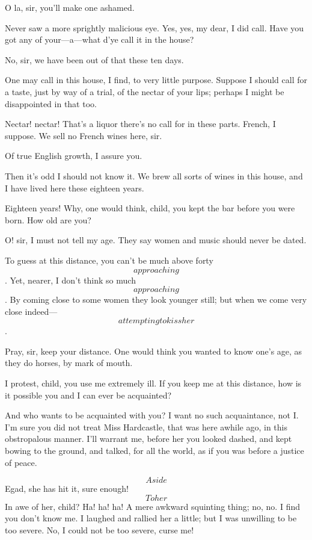 \documentclass{book}
\begin{document}
\8  O la, sir, you'll make one ashamed.

\2  Never saw a more sprightly malicious eye.  Yes, yes, my dear,
I did call.  Have you got any of your---a---what d'ye call it in the
house?

\8  No, sir, we have been out of that these ten days.

\2  One may call in this house, I find, to very little purpose. 
Suppose I should call for a taste, just by way of a trial, of the
nectar of your lips; perhaps I might be disappointed in that too.

\8  Nectar! nectar!  That's a liquor there's no call for
in these parts.  French, I suppose.  We sell no French wines here, sir.

\2  Of true English growth, I assure you.

\8  Then it's odd I should not know it.  We brew all
sorts of wines in this house, and I have lived here these eighteen
years.

\2  Eighteen years!  Why, one would think, child, you kept the bar
before you were born.  How old are you?

\8  O! sir, I must not tell my age.  They say women and
music should never be dated.

\2  To guess at this distance, you can't be much above forty
\[approaching\].  Yet, nearer, I don't think so much \[approaching\].  By
coming close to some women they look younger still; but when we come
very close indeed---\[attempting to kiss her\].

\8  Pray, sir, keep your distance.  One would think you
wanted to know one's age, as they do horses, by mark of mouth.

\2  I protest, child, you use me extremely ill.  If you keep me at
this distance, how is it possible you and I can ever be acquainted?

\8  And who wants to be acquainted with you?  I want no
such acquaintance, not I.  I'm sure you did not treat Miss Hardcastle,
that was here awhile ago, in this obstropalous manner.  I'll warrant
me, before her you looked dashed, and kept bowing to the ground, and
talked, for all the world, as if you was before a justice of peace.

\2  \[Aside\]  Egad, she has hit it, sure enough!  \[To her\]  In
awe of her, child?  Ha! ha! ha!  A mere awkward squinting thing; no,
no.  I find you don't know me.  I laughed and rallied her a little; but
I was unwilling to be too severe.  No, I could not be too severe, curse
me!
\end{document}
